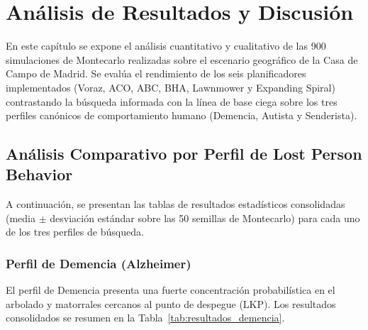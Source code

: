 \chapter{Análisis de Resultados y Discusión}
\label{ch:resultados}

En este capítulo se expone el análisis cuantitativo y cualitativo de las 900 simulaciones de Montecarlo realizadas sobre el escenario geográfico de la Casa de Campo de Madrid. Se evalúa el rendimiento de los seis planificadores implementados (Voraz, ACO, ABC, BHA, Lawnmower y Expanding Spiral) contrastando la búsqueda informada con la línea de base ciega sobre los tres perfiles canónicos de comportamiento humano (Demencia, Autista y Senderista).

\section{Análisis Comparativo por Perfil de Lost Person Behavior}

A continuación, se presentan las tablas de resultados estadísticos consolidadas (media $\pm$ desviación estándar sobre las 50 semillas de Montecarlo) para cada uno de los tres perfiles de búsqueda.

\subsection{Perfil de Demencia (Alzheimer)}

El perfil de Demencia presenta una fuerte concentración probabilística en el arbolado y matorrales cercanos al punto de despegue (LKP). Los resultados consolidados se resumen en la Tabla~\ref{tab:resultados_demencia}.

